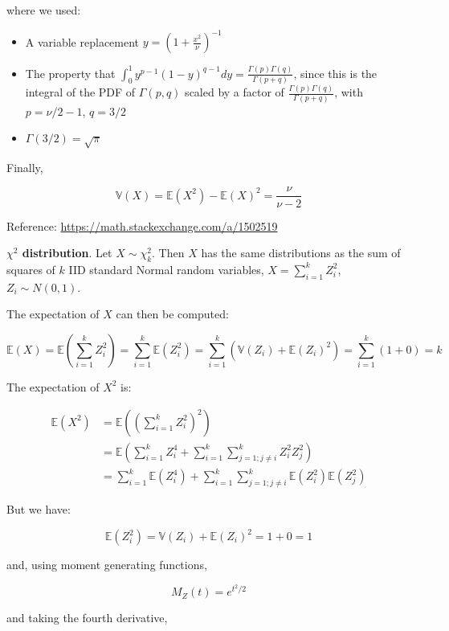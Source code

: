 where we used:

\begin{itemize}[tightlist]
\item
  A variable replacement \(y = \left( 1 + \frac{x^{2}}{\nu} \right)^{-1}\)
\item
  The property that
  \(\int_{0}^{1} y^{p - 1} (1 - y)^{q - 1} dy = \frac{\Gamma(p) \Gamma(q)}{\Gamma(p + q)}\),
  since this is the integral of the PDF of \(\Gamma(p, q)\) scaled by a
  factor of \(\frac{\Gamma(p) \Gamma(q)}{\Gamma(p + q)}\), with
  \(p = \nu / 2 - 1\), \(q = 3/2\)
\item
  \(\Gamma(3 / 2) = \sqrt{\pi}\)
\end{itemize}

Finally,

\[ \mathbb{V}(X) = \mathbb{E}(X^{2}) - \mathbb{E}(X)^{2} = \frac{\nu}{\nu - 2} \]

Reference: \url{https://math.stackexchange.com/a/1502519}

\textbf{\(\chi^{2}\) distribution}. Let \(X \sim \chi^{2}_{k}\). Then \(X\)
has the same distributions as the sum of squares of \(k\) IID standard
Normal random variables, \(X = \sum_{i=1}^{k} Z_{i}^{2}\),
\(Z_{i} \sim N(0, 1)\).

The expectation of \(X\) can then be computed:

\[ \mathbb{E}(X) = \mathbb{E}\left( \sum_{i=1}^{k} Z_{i}^{2} \right) = \sum_{i=1}^{k} \mathbb{E}(Z_{i}^{2}) = \sum_{i=1}^{k} (\mathbb{V}(Z_{i}) + \mathbb{E}(Z_{i})^{2}) = \sum_{i=1}^{k} (1 + 0) = k \]

The expectation of \(X^{2}\) is:

\begin{align*}
\mathbb{E}(X^{2}) &= \mathbb{E}\left( \left( \sum_{i=1}^{k} Z_{i}^{2} \right)^{2} \right) \\
&= \mathbb{E}\left( \sum_{i=1}^{k} Z_{i}^{4} + \sum_{i=1}^{k} \sum_{j=1; j \neq i}^{k} Z_{i}^{2} Z_{j}^{2} \right) \\
&= \sum_{i=1}^{k} \mathbb{E}(Z_{i}^{4}) + \sum_{i=1}^{k} \sum_{j=1; j \neq i}^{k} \mathbb{E}(Z_{i}^{2}) \mathbb{E}(Z_{j}^{2})
\end{align*}

But we have:

\[ \mathbb{E}(Z_{i}^{2}) = \mathbb{V}(Z_{i}) + \mathbb{E}(Z_{i})^{2} = 1 + 0 = 1 \]

and, using moment generating functions,

\[M_Z(t) = e^{t^{2} / 2}\]

and taking the fourth derivative,

